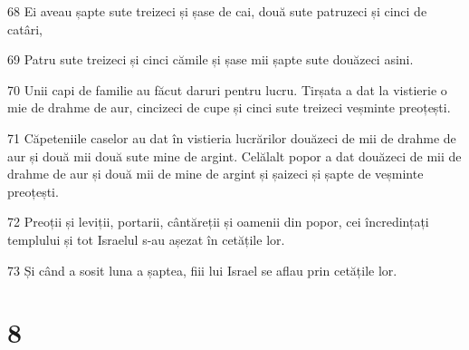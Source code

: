 \par 68 Ei aveau șapte sute treizeci și șase de cai, două sute patruzeci și cinci de catâri,
\par 69 Patru sute treizeci și cinci cămile și șase mii șapte sute douăzeci asini.
\par 70 Unii capi de familie au făcut daruri pentru lucru. Tirșata a dat la vistierie o mie de drahme de aur, cincizeci de cupe și cinci sute treizeci veșminte preoțești.
\par 71 Căpeteniile caselor au dat în vistieria lucrărilor douăzeci de mii de drahme de aur și două mii două sute mine de argint. Celălalt popor a dat douăzeci de mii de drahme de aur și două mii de mine de argint și șaizeci și șapte de veșminte preoțești.
\par 72 Preoții și leviții, portarii, cântăreții și oamenii din popor, cei încredințați templului și tot Israelul s-au așezat în cetățile lor.
\par 73 Și când a sosit luna a șaptea, fiii lui Israel se aflau prin cetățile lor.

\chapter{8}

